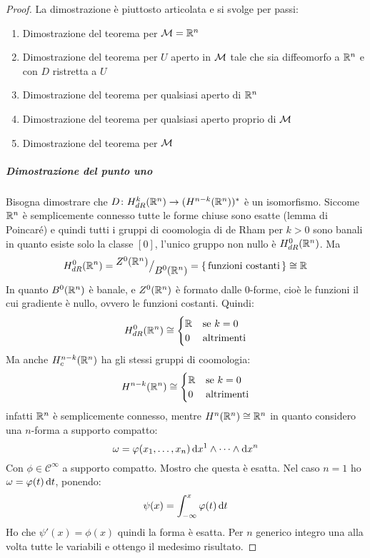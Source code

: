 \begin{proof}
  La dimostrazione è piuttosto articolata e si svolge per passi:
  \begin{enumerate}
  \item Dimostrazione del teorema per $ \mathcal{M} = \mathbb{R}^{n} $
  \item Dimostrazione del teorema per $ U $ aperto in $ \mathcal{M} $ tale che sia diffeomorfo a $ \mathbb{R}^{n} $
    e con $ D $ ristretta a $ U $
  \item Dimostrazione del teorema per qualsiasi aperto di $ \mathbb{R}^{n} $
  \item Dimostrazione del teorema per qualsiasi aperto proprio di $ \mathcal{M} $
  \item Dimostrazione del teorema per $ \mathcal{M} $
  \end{enumerate}

  \subparagraph{Dimostrazione del punto uno} Bisogna dimostrare che
  $ D \colon H^k_{dR}(\mathbb{R}^{n}) \to (H^{n-k}(\mathbb{R}^{n}))^* $ è un isomorfismo. Siccome
  $ \mathbb{R}^{n} $ è semplicemente connesso tutte le forme chiuse sono esatte (lemma
  di Poincaré) e quindi tutti i gruppi di coomologia di de Rham per $ k > 0 $
  sono banali in quanto esiste solo la classe $ [0] $, l'unico gruppo non nullo
  è $ H^0_{dR}(\mathbb{R}^{n}) $. Ma
  \[
    H^0_{dR}(\mathbb{R}^{n}) = {^{\textstyle Z^0(\mathbb{R}^{n})}\big/_{\textstyle B^0(\mathbb{R}^{n})}} = {\set{\text{funzioni costanti}}} \cong \mathbb{R}^{}
  \]
  In quanto $ B^0(\mathbb{R}^{n}) $ è banale, e $ Z^0(\mathbb{R}^{n}) $ è formato dalle
  $ 0 $-forme, cioè le funzioni il cui gradiente è nullo, ovvero le funzioni
  costanti. Quindi:
  \[
    H^0_{dR}(\mathbb{R}^{n}) \cong
    \begin{cases}
      \mathbb{R}^{} & \text{se } k = 0 \\
      0 & \text{altrimenti}
    \end{cases}
  \]
  Ma anche $ H^{n-k}_c(\mathbb{R}^{n}) $ ha gli stessi gruppi di coomologia:
  \[
    H^{n-k}(\mathbb{R}^{n}) \cong
    \begin{cases}
      \mathbb{R}^{} & \text{se } k = 0 \\
      0 & \text{altrimenti}
    \end{cases}
  \]
  infatti $ \mathbb{R}^{n} $ è semplicemente connesso, mentre
  $ H^{n}(\mathbb{R}^{n}) \cong \mathbb{R}^{n} $ in quanto considero una $ n $-forma a supporto compatto:
  \[
    \omega = \varphi(x_1, \dots, x_n) \operatorname{d}\!{x}^1 \wedge \dots \wedge \operatorname{d}\!{x}^n
  \]
  Con $ \phi \in \mathcal{C}^\infty $ a supporto compatto. Mostro che questa è esatta.
  Nel caso $ n = 1 $ ho $ \omega = \varphi(t) \operatorname{d}\!{t} $, ponendo:
  \[
    \psi(x) = \int_{-\infty}^x \varphi(t) \operatorname{d}\!{t}
  \]
  Ho che $ \psi'(x) = \phi(x) $ quindi la forma è esatta. Per $ n $ generico integro
  una alla volta tutte le variabili e ottengo il medesimo risultato.


\end{proof}
